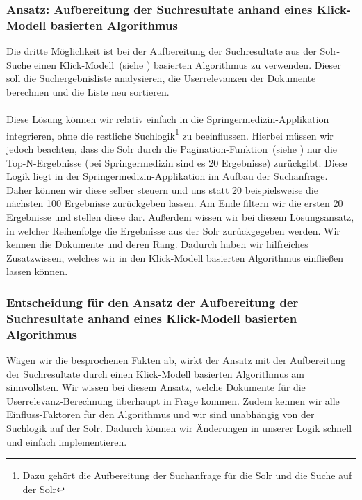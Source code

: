 \subsubsection{Ansatz: Aufbereitung der Suchresultate anhand eines Klick-Modell basierten Algorithmus}
\label{sec:Reranking:Methodik:SucheEinbinden:Suchresultate}

Die dritte Möglichkeit ist bei der Aufbereitung der Suchresultate aus der Solr-Suche einen Klick-Modell~(siehe \cite{pbm}) basierten Algorithmus zu verwenden. Dieser soll die Suchergebnisliste analysieren, die Userrelevanzen der Dokumente berechnen und die Liste neu sortieren. 
\\
\\
Diese Lösung können wir relativ einfach in die Springermedizin-Applikation integrieren, ohne die restliche Suchlogik\footnote{Dazu gehört die Aufbereitung der Suchanfrage für die Solr und die Suche auf der Solr} zu beeinflussen. Hierbei müssen wir jedoch beachten, dass die Solr durch die Pagination-Funktion~(siehe \cite{Pagination}) nur die Top-N-Ergebnisse (bei Springermedizin sind es 20 Ergebnisse) zurückgibt. Diese Logik liegt in der Springermedizin-Applikation im Aufbau der Suchanfrage. Daher können wir diese selber steuern und uns statt 20 beispielsweise die nächsten 100 Ergebnisse zurückgeben lassen. Am Ende filtern wir die ersten 20 Ergebnisse und stellen diese dar. Außerdem wissen wir bei diesem Lösungsansatz, in welcher Reihenfolge die Ergebnisse aus der Solr zurückgegeben werden. Wir kennen die Dokumente und deren Rang. Dadurch haben wir hilfreiches Zusatzwissen, welches wir in den Klick-Modell basierten Algorithmus einfließen lassen können.

\subsubsection{Entscheidung für den Ansatz der Aufbereitung der Suchresultate anhand eines Klick-Modell basierten Algorithmus}
\label{sec:Reranking:Methodik:SucheEinbinden:Entscheidung}

Wägen wir die besprochenen Fakten ab, wirkt der Ansatz mit der Aufbereitung der Suchresultate durch einen Klick-Modell basierten Algorithmus am sinnvollsten. Wir wissen bei diesem Ansatz, welche Dokumente für die Userrelevanz-Berechnung überhaupt in Frage kommen. Zudem kennen wir alle Einfluss-Faktoren für den Algorithmus und wir sind unabhängig von der Suchlogik auf der Solr. Dadurch können wir Änderungen in unserer Logik schnell und einfach implementieren.

